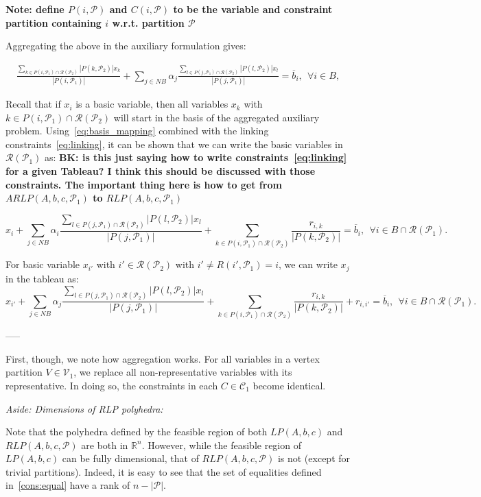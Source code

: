 \documentclass[runningheads]{llncs}
\newcommand{\cP}{{\mathcal P}}
\newcommand{\cC}{{\mathcal C}}
\newcommand{\cV}{{\mathcal V}}
\newcommand{\cR}{{\mathcal R}}
\begin{document}
 {\bf Note: define $P(i,\cP)$ and $C(i,\cP)$ to be the variable and constraint partition containing $i$ w.r.t. partition $\cP$}

Aggregating the above in the auxiliary formulation gives:


\begin{align}
\frac{\sum_{k \in P(i,\cP_1) \cap \cR(\cP_2) } |P(k,\cP_2)|x_k}{|P(i,\cP_1)|}
+ \sum_{j \in NB} \alpha_j \frac{\sum_{l \in P(j,\cP_1) \cap \cR(\cP_2) } |P(l,\cP_2)|x_l }{|P(j,\cP_1)|} 
 = \overline{b}_i, \ \ \forall i \in B, \label{eq:basis_mapping}
\end{align}

Recall that if $x_i$ is a basic variable, then all variables $x_k$ with $k \in P(i,\cP_1) \cap \cR(\cP_2)$ will start in the basis of the aggregated auxiliary problem. Using~\eqref{eq:basis_mapping} combined with the linking constraints~\eqref{eq:linking}, it can be shown that we can write the basic variables in $\cR(\cP_1)$ as:
{\bf BK: is this just saying how to write constraints~\eqref{eq:linking} for a given Tableau? I think this should be discussed with those constraints. The important thing here is how to get from $ARLP(A,b,c,\cP_1)$ to $RLP(A,b,c,\cP_1)$}

$$x_i + \sum_{j \in NB} \alpha_i \frac{\sum_{l \in P(j,\cP_1) \cap \cR(\cP_2) } |P(l,\cP_2)|x_l }{|P(j,\cP_1)|}  + \sum_{k \in P(i,\cP_1) \cap \cR(\cP_2)} \frac {r_{i,k} } {|P(k,\cP_2)|} = \overline{b}_i, \ \ \forall i \in B\cap \cR(\cP_1).$$

For basic variable $x_{i'}$ with $i'\in \cR(\cP_2)$ with $i' \neq R(i',\cP_1) = i$, we can write $x_j$ in the tableau as: 
$$x_{i'} + \sum_{j \in NB} \alpha_j \frac{\sum_{l \in P(j,\cP_1) \cap \cR(\cP_2) } |P(l,\cP_2)|x_l }{|P(j,\cP_1)|}  + \sum_{k \in P(i,\cP_1) \cap \cR(\cP_2)} \frac {r_{i,k} } {|P(k,\cP_2)|}  + r_{i,i'}= \overline{b}_i, \ \ \forall i \in B\cap \cR(\cP_1).$$


 -----
 



First, though, we note how aggregation works. For all variables in a vertex partition $V \in \cV_1$, we replace all non-representative variables with its representative. In doing so, the constraints in each $C \in \cC_1$ become identical. 

{\em Aside: Dimensions of RLP polyhedra:}

Note that the polyhedra defined by the feasible region of both $LP(A,b,c)$ and
$RLP(A,b,c,\cP)$ are both in $\mathbb{R}^n$. However, while the feasible
region of $LP(A,b,c)$ can be fully dimensional, that of $RLP(A,b,c,\cP)$ is not
(except for trivial partitions). Indeed, it is easy to see that the set of
equalities defined in~\eqref{cons:equal} have a rank of $n - |\cP|$.
\end{document}
